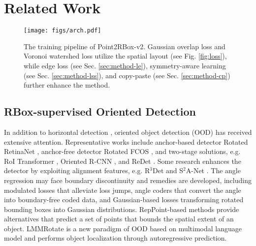 \section{Related Work}
\label{sec:related}

\begin{figure*}[t]
\setlength{\abovecaptionskip}{1.2mm}
\centering
\texttt{[image: figs/arch.pdf]}
\caption{The training pipeline of Point2RBox-v2. Gaussian overlap loss and Voronoi watershed loss utilize the spatial layout (see Fig. \ref{fig:loss}), while edge loss (see Sec. \ref{sec:method-le}), symmetry-aware learning (see Sec. \ref{sec:method-lss}), and copy-paste (see Sec. \ref{sec:method-cp}) further enhance the method.}
\label{fig:arch}
\vspace{-6pt}
\end{figure*}

\subsection{RBox-supervised Oriented Detection} 

In addition to horizontal detection \citep{zhao2019object,liu2020deep}, oriented object detection (OOD) \citep{yang2018automatic,wen2023comprehensive} has received extensive attention. Representative works include anchor-based detector Rotated RetinaNet \citep{lin2017focal}, anchor-free detector Rotated FCOS \citep{tian2019fcos}, and two-stage solutions, e.g. RoI Transformer \citep{ding2018learning}, Oriented R-CNN \citep{xie2021oriented}, and ReDet \citep{han2021redet}. Some research enhances the detector by exploiting alignment features, e.g. R$^3$Det \citep{yang2021r3det} and S$^2$A-Net \citep{han2022align}. The angle regression may face boundary discontinuity and remedies are developed, including modulated losses \citep{yang2019scrdet, yang2022scrdet++, qian2021rsdet} that alleviate loss jumps, angle coders \citep{yang2020arbitrary, yang2021dense, yang2022arbitrary, yu2023psc} that convert the angle into boundary-free coded data, and Gaussian-based losses \citep{yang2021rethinking, yang2021learning, yang2023detecting, yang2023kfiou, murrugarra2024probabilistic} transforming rotated bounding boxes into Gaussian distributions. RepPoint-based methods \citep{yang2019reppoints, hou2022grep, li2022oriented} provide alternatives that predict a set of points that bounds the spatial extent of an object. LMMRotate \cite{li2025simple} is a new paradigm of OOD based on multimodal language model and performs object localization through autoregressive prediction.

